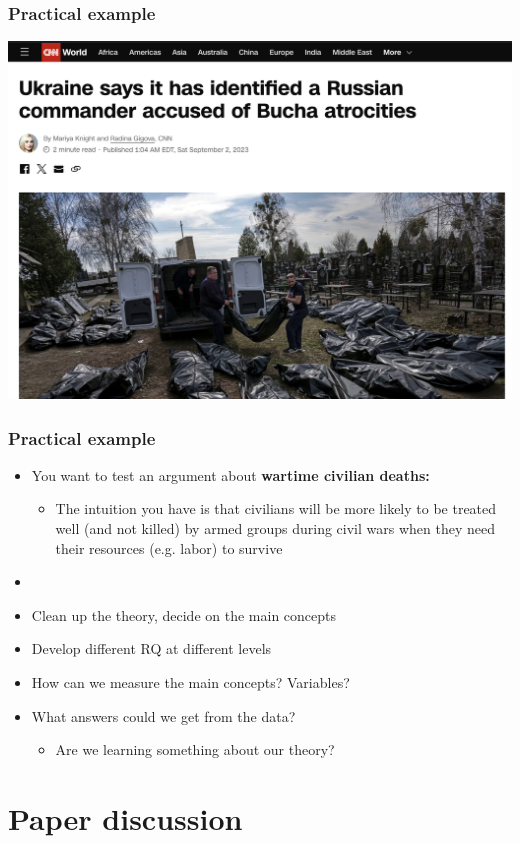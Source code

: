 \documentclass[aspectratio=43]{beamer}
\begin{document}
\begin{frame}
\frametitle{Practical example}
\centering

\includegraphics[width = \textwidth]{../img/bucha}
  

\end{frame}
  

\begin{frame}
\frametitle{Practical example}
\centering

\begin{itemize}
  \item You want to test an argument about \textbf{wartime civilian deaths:}
  \begin{itemize}
    \item The intuition you have is that civilians will be more likely to be treated well (and not killed) by armed groups during civil wars when they need their resources (e.g. labor) to survive
  \end{itemize}
  \item[]
  \item Clean up the theory, decide on the main concepts
  \item Develop different RQ at different levels
  \item How can we measure the main concepts? Variables?
  \item What answers could we get from the data?
    \begin{itemize}
      \item Are we learning something about our theory?
    \end{itemize}
\end{itemize}

\end{frame}

\section{Paper discussion}


\end{document}
